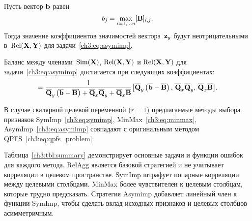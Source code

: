\documentclass[11pt, a5paper]{dissert}
\begin{document}
\begin{statement}
	Пусть вектор $\mathbf{b}$ равен
	\begin{equation*}
	b_j = \max_{i=1, \dots n} [\mathbf{B}]_{i, j}.
	\end{equation*}
	Тогда значение коэффициентов значимостей вектора~$\mathbf{z}_y$ будут неотрицательными в~$\text{Rel}(\mathbf{X}, \mathbf{Y})$ для задачи~\eqref{ch3:eq:asymimp}.
\end{statement}

\begin{statement}
	Баланс между членами~$\text{Sim}(\mathbf{X})$, $\text{Rel}(\mathbf{X}, \mathbf{Y})$ и $\text{Rel}(\mathbf{X}, \mathbf{Y})$ для задачи~\eqref{ch3:eq:asymimp} достигается при следующих коэффициентах:
	\begin{equation*}
		[\alpha_1, \alpha_2, \alpha_3] = \frac{1}{\overline{\bQ}_y \left( \overline{\bb} - \overline{\bB}\right) + \overline{\bQ}_x \overline{\bQ}_y + \overline{\bQ}_x \overline{\bB}} \bigl [\overline{\bQ}_y \left( \overline{\bb} - \overline{\bB}\right), \, \overline{\bQ}_x \overline{\bQ}_y, \, \overline{\bQ}_x \overline{\bB}\bigr].
	\end{equation*}
\end{statement}

\begin{theorem}
	В случае скалярной целевой переменной ($r=1$) предлагаемые методы выбора признаков SymImp~\eqref{ch3:eq:symimp}, MinMax~\eqref{ch3:eq:minmax}, AsymImp~\eqref{ch3:eq:asymimp} совпадают с оригинальным методом QPFS~\eqref{ch3:eq:qpfs_problem}.
\end{theorem}

Таблица~\ref{ch3:tbl:summary} демонстрирует основные задачи и функции ошибок для каждого метода. 
RelAgg является базовой стратегией и не учитывает корреляции в целевом пространстве.
SymImp штрафует попарные корреляции между целевыми столбцами.
MinMax более чувствителен к целевым столбцам, которые трудно предсказать.
Стратегия Asymimp добавляет линейный член к функции SymImp, чтобы сделать вклад исходных признаков и целевых столбцов асимметричным.
\end{document}
